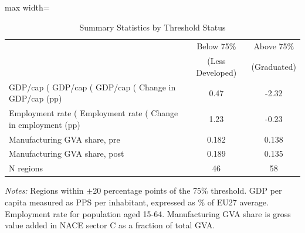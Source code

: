 \begin{table}[htbp]
\centering
\caption{Summary Statistics by Threshold Status}
\label{tab:sumstats}
\begin{adjustbox}{max width=\textwidth}
\begin{tabular}{lcc}
\hline\hline
 & Below 75\% & Above 75\% \\
 & (Less Developed) & (Graduated) \\
\hline
GDP/cap (%
GDP/cap (%
GDP/cap (%
Change in GDP/cap (pp) & 0.47 & -2.32 \\
Employment rate (%
Employment rate (%
Change in employment (pp) & 1.23 & -0.23 \\
Manufacturing GVA share, pre & 0.182 & 0.138 \\
Manufacturing GVA share, post & 0.189 & 0.135 \\
N regions & 46 & 58 \\
\hline\hline
\end{tabular}
\end{adjustbox}
\begin{tablenotes}[flushleft]\small
\item \textit{Notes:} Regions within $\pm$20 percentage points of the 75\% threshold. GDP per capita measured as PPS per inhabitant, expressed as \% of EU27 average. Employment rate for population aged 15-64. Manufacturing GVA share is gross value added in NACE sector C as a fraction of total GVA.
\end{tablenotes}
\end{table}

